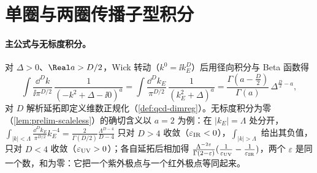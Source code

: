 \section{单圈与两圈传播子型积分}\label{sec:appC-integrals}

\paragraph{主公式与无标度积分。}对 $\Delta>0$、$\Real a>D/2$，Wick 转动（$k^0=\ii k_E^D$）后用径向积分与 Beta 函数得
\begin{equation}\label{eq:appC-master}
\int\frac{\dd^Dk}{\ii\pi^{D/2}}\,\frac{1}{(-k^2+\Delta-\ii0)^a}=\int\frac{\dd^Dk_E}{\pi^{D/2}}\,\frac1{(k_E^2+\Delta)^a}=\frac{\Gamma(a-\frac D2)}{\Gamma(a)}\,\Delta^{\frac D2-a} ,
\end{equation}
对 $D$ 解析延拓即定义维数正规化（\cref{def:qcd-dimreg}）。无标度积分为零（\cref{lem:prelim-scaleless}）的确切含义以 $a=2$ 为例：在 $|k_E|=\Lambda$ 处分开，$\int_{|k|<\Lambda}\frac{\dd^Dk_E}{\pi^{D/2}}k_E^{-4}=\frac2{\Gamma(D/2)}\frac{\Lambda^{D-4}}{D-4}$ 只对 $D>4$ 收敛（$\varepsilon_{\rm IR}<0$），$\int_{|k|>\Lambda}$ 给出其负值，只对 $D<4$ 收敛（$\varepsilon_{\rm UV}>0$）；各自延拓后相加得 $\frac{\Lambda^{-2\varepsilon}}{\Gamma(2-\varepsilon)}(\frac1{\varepsilon_{\rm UV}}-\frac1{\varepsilon_{\rm IR}})$，两个 $\varepsilon$ 是同一个数，和为零：它把一个紫外极点与一个红外极点等同起来。

